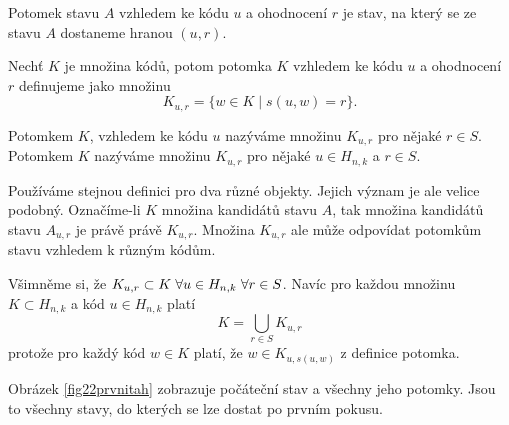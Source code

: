 \begin{definice}[Potomek]\label{potomek}
  
  Potomek stavu $A$ vzhledem ke kódu $u$ a ohodnocení $r$ je stav, na který se ze stavu $A$ dostaneme hranou $(u,r)$. 
  
  Nechť $K$ je množina kódů, potom potomka $K$ vzhledem ke kódu $u$ a ohodnocení $r$ definujeme jako množinu
  \[K_{u,r} = \{w \in K \mid s(u,w) = r\}.\] 
\end{definice}

\begin{pozn}
    Potomkem $K$, vzhledem ke kódu $u$ nazýváme množinu $K_{u,r}$ pro nějaké $r \in S$. Potomkem $K$ nazýváme množinu $K_{u,r}$ pro nějaké $u\in H_{n,k}$ a $r \in S$. 
\end{pozn}



\begin{pozn}
    Používáme stejnou definici pro dva různé objekty. Jejich význam je ale velice podobný. Označíme-li $K$ množina kandidátů stavu $A$, tak množina kandidátů stavu $A_{u,r}$ je právě právě $K_{u,r}$. Množina $K_{u,r}$ ale může odpovídat potomkům stavu vzhledem k různým kódům. 
\end{pozn}

\begin{pozn}
    Všimněme si, že $K_{u,r} \subset K \hspace{3px}\forall u\in H_{n,k} \hspace{3px}\forall r\in S$. Navíc pro každou množinu $K \subset H_{n,k}$ a kód $u \in H_{n,k}$ platí
    \[K = \bigcup_{r\in S} K_{u,r}\]
    protože pro každý kód $w \in K$ platí, že $w \in K_{u, s(u,w)}$ z definice potomka.
\end{pozn}

Obrázek \ref{fig22prvnitah} zobrazuje počáteční stav a všechny jeho potomky. Jsou to všechny stavy, do kterých se lze dostat po prvním pokusu. 


